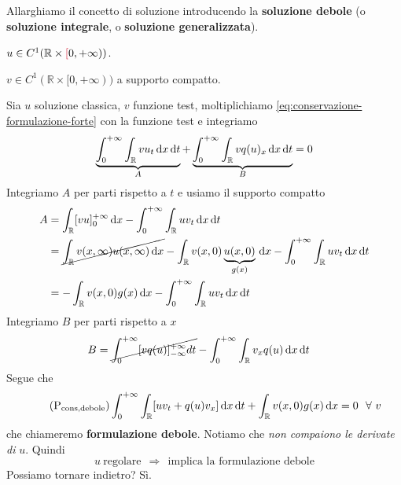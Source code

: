 Allarghiamo il concetto di soluzione introducendo la \textbf{soluzione debole} (o \textbf{soluzione integrale}, o \textbf{soluzione generalizzata}).
\begin{definition}
     $u\in C^{1}(\mathbb{R} \times \textcolor[rgb]{0.82,0.01,0.11}{[} 0,+\infty))$.
\end{definition}
\begin{definition}
     $v\in C^{1}(\mathbb{R} \times [ 0,+\infty))$ a supporto compatto.
\end{definition}
Sia $u$ soluzione classica, $v$ funzione test, moltiplichiamo \eqref{eq:conservazione-formulazione-forte} con la funzione test e integriamo
\begin{equation*}
    \underbrace{\int ^{+\infty }_{0}\int _{\mathbb{R}} vu_{t} \,\mathrm d x\,\mathrm d t}_{A} +\underbrace{\int ^{+\infty }_{0}\int _{\mathbb{R}} vq(u)_{x} \,\mathrm d x\,\mathrm d t}_{B} =0
\end{equation*}
Integriamo $A$ per parti rispetto a $t$ e usiamo il supporto compatto
\begin{align*}
    A & =\int _{\mathbb{R}}[ vu]^{+\infty }_{0} \,\mathrm d x-\int ^{+\infty }_{0}\int _{\mathbb{R}} uv_{t} \,\mathrm d x\,\mathrm d t                                                                        \\
      & = \cancel{\int _{\mathbb{R}} v(x,\infty) u(x,\infty) \,\mathrm d x} -\int _{\mathbb{R}} v(x,0)\underbrace{u(x,0)}_{g(x)} \,\mathrm d x-\int ^{+\infty }_{0}\int _{\mathbb{R}} uv_{t} \,\mathrm d x\,\mathrm d t \\
      & =-\int _{\mathbb{R}} v(x,0) g(x) \,\mathrm d x-\int ^{+\infty }_{0}\int _{\mathbb{R}} uv_{t} \,\mathrm d x\,\mathrm d t
\end{align*}
Integriamo $B$ per parti rispetto a $x$
\begin{align*}
    B & =\cancel{\int ^{+\infty }_{0}[ vq(u)]^{+\infty }_{-\infty } dt} -\int ^{+\infty }_{0}\int _{\mathbb{R}} v_{x} q(u) \,\mathrm d x\,\mathrm d t
\end{align*}
Segue che
\begin{equation}
    \tag{P$_{\text{cons,debole}}$}
    \int ^{+\infty }_{0}\int _{\mathbb{R}}[ uv_{t} +q(u) v_{x}] \dx\dt+\int _{\mathbb{R}} v(x,0) g(x) \dx=0\ \ \forall \ v
    \label{eq:conservazione-formulazione-debole}
\end{equation}
che chiameremo \textbf{formulazione debole}. Notiamo che \textit{non compaiono le derivate di} $u$. Quindi
\begin{equation*}
    u\ \text{regolare} \ \ \Rightarrow \ \ \text{implica la formulazione debole}
\end{equation*}
Possiamo tornare indietro? Sì.

